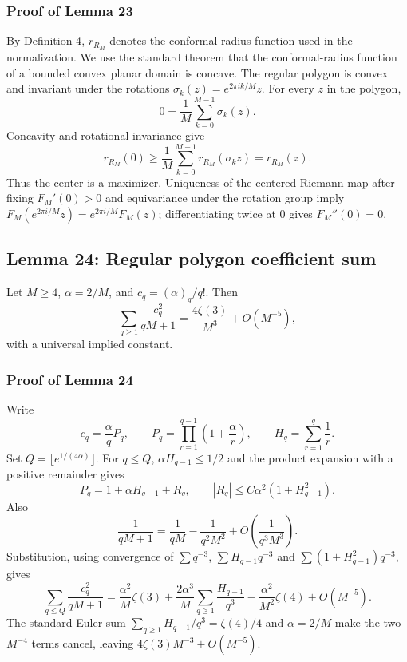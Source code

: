 \documentclass[11pt]{article}
\begin{document}
\subsubsection{Proof of Lemma
23}\label{proof-lem-regular-center-maximizer}

By \hyperref[def-conformal-data]{Definition 4}, \(r_{R_M}\) denotes the
conformal-radius function used in the normalization. We use the standard
theorem that the conformal-radius function of a bounded convex planar
domain is concave. The regular polygon is convex and invariant under the
rotations \(\sigma_k(z)=e^{2\pi ik/M}z\). For every \(z\) in the
polygon, \[
0=\frac1M\sum_{k=0}^{M-1}\sigma_k(z).
\] Concavity and rotational invariance give \[
r_{R_M}(0)\ge\frac1M\sum_{k=0}^{M-1}r_{R_M}(\sigma_kz)=r_{R_M}(z).
\] Thus the center is a maximizer. Uniqueness of the centered Riemann
map after fixing \(F_M'(0)>0\) and equivariance under the rotation group
imply \(F_M(e^{2\pi i/M}z)=e^{2\pi i/M}F_M(z)\); differentiating twice
at \(0\) gives \(F_M''(0)=0\).

\subsection{Lemma 24: Regular polygon coefficient
sum}\label{lem-regular-sc-coefficient-sum}

Let \(M\ge4\), \(\alpha=2/M\), and \(c_q=(\alpha)_q/q!\). Then \[
\sum_{q\ge1}\frac{c_q^2}{qM+1}
=\frac{4\zeta(3)}{M^3}+O(M^{-5}),
\] with a universal implied constant.

\subsubsection{Proof of Lemma
24}\label{proof-lem-regular-sc-coefficient-sum}

Write \[
c_q=\frac\alpha qP_q,
\qquad P_q=\prod_{r=1}^{q-1}\left(1+\frac\alpha r\right),
\qquad H_q=\sum_{r=1}^q\frac1r.
\] Set \(Q=\lfloor e^{1/(4\alpha)}\rfloor\). For \(q\le Q\),
\(\alpha H_{q-1}\le1/2\) and the product expansion with a positive
remainder gives \[
P_q=1+\alpha H_{q-1}+R_q,
\qquad |R_q|\le C\alpha^2(1+H_{q-1}^2).
\] Also \[
\frac1{qM+1}=\frac1{qM}-\frac1{q^2M^2}+O\left(\frac1{q^3M^3}\right).
\] Substitution, using convergence of \(\sum q^{-3}\),
\(\sum H_{q-1}q^{-3}\) and \(\sum(1+H_{q-1}^2)q^{-3}\), gives \[
\sum_{q\le Q}\frac{c_q^2}{qM+1}
=\frac{\alpha^2}{M}\zeta(3)
 +\frac{2\alpha^3}{M}\sum_{q\ge1}\frac{H_{q-1}}{q^3}
 -\frac{\alpha^2}{M^2}\zeta(4)+O(M^{-5}).
\] The standard Euler sum \(\sum_{q\ge1}H_{q-1}/q^3=\zeta(4)/4\) and
\(\alpha=2/M\) make the two \(M^{-4}\) terms cancel, leaving
\(4\zeta(3)M^{-3}+O(M^{-5})\).
\end{document}
